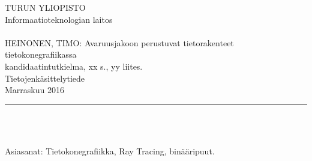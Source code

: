 

\setlength{\hoffset}{-1in} \setlength{\oddsidemargin}{4cm} \addtolength{\textwidth}{1.3cm} \addtolength{\textheight}{1cm} \setlength{\voffset}{-1in}

\thispagestyle{empty}  %

\noindent
TURUN YLIOPISTO\\
Informaatioteknologian laitos\\
\\
HEINONEN, TIMO: Avaruusjakoon perustuvat tietorakenteet tietokonegrafiikassa\\
kandidaatintutkielma, xx s., yy liites.\\
Tietojenkäsittelytiede\\
Marraskuu 2016\\
\rule{\textwidth}{.2mm}\\
\\
\vspace{4mm}%
\vspace{4mm}
\vspace{4mm}

\vspace{4mm}Asiasanat: Tietokonegrafiikka, Ray Tracing, binääripuut.

